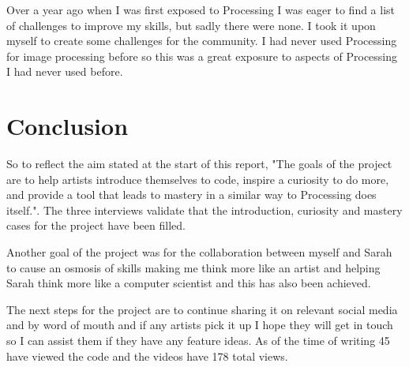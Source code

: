 \documentclass[a4paper]{report}
\begin{document}
Over a year ago when I was first exposed to Processing I was eager to find a list of challenges to improve my skills, but sadly there were none. I took it upon myself to create some challenges for the community. I had never used Processing for image processing before so this was a great exposure to aspects of Processing I had never used before.

\section{Conclusion}
So to reflect the aim stated at the start of this report,
"The goals of the project are to help artists introduce themselves to code, inspire a curiosity to do more, and provide a tool that leads to mastery in a similar way to Processing\cite{PROCESSING} does itself.". The three interviews validate that the introduction, curiosity and mastery cases for the project have been filled.

Another goal of the project was for the collaboration between myself and Sarah to cause an osmosis of skills making me think more like an artist and helping Sarah think more like a computer scientist and this has also been achieved. 

The next steps for the project are to continue sharing it on relevant social media and by word of mouth and if any artists pick it up I hope they will get in touch so I can assist them if they have any feature ideas. As of the time of writing 45 have viewed the code and the videos have 178 total views.


\end{document}
